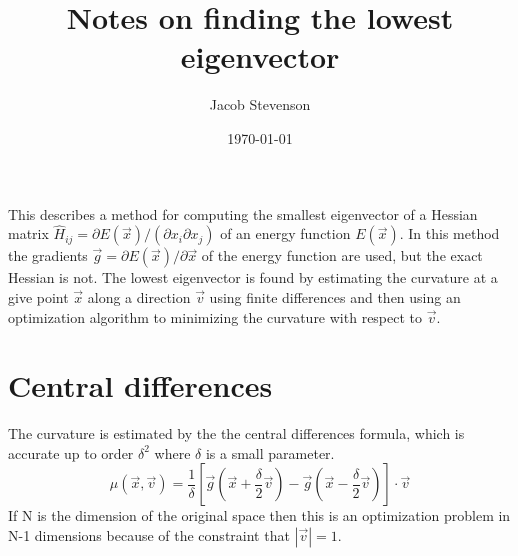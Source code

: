 \documentclass[a4paper]{article}
\title{Notes on finding the lowest eigenvector}
\author{Jacob Stevenson}
\date{\today}
\begin{document}
\maketitle

This describes a method for computing the smallest eigenvector of a Hessian
matrix $\hat{H}_{ij} = \partial E(\vec{x}) / (\partial{x_i}\partial x_j)$ of an
energy function $E(\vec{x})$.  In this method the gradients $\vec{g} = \partial
E(\vec{x}) / \partial \vec{x}$ of the energy function are used, but the exact
Hessian is not.  The lowest eigenvector is found by estimating the curvature at
a give point $\vec{x}$ along a direction $\vec{v}$ using finite differences and
then using an optimization algorithm to minimizing the curvature with respect
to $\vec{v}$.  

\section{Central differences}
The curvature is estimated by the the central differences formula, which is
accurate up to order $\delta^2$ where $\delta$ is a small parameter.
\begin{equation}
\mu(\vec{x}, \vec{v}) = \frac{1}{\delta} 
\left[ \vec{g}(\vec{x} + \frac{\delta}{2}  \vec{v}) - 
\vec{g}(\vec{x} - \frac{\delta}{2} \vec{v}) \right] \cdot \vec{v}
\end{equation}
If N is the dimension of the original space then this is an optimization
problem in N-1 dimensions because of the constraint that $\left|\vec{v} \right|
= 1$.
\end{document}
